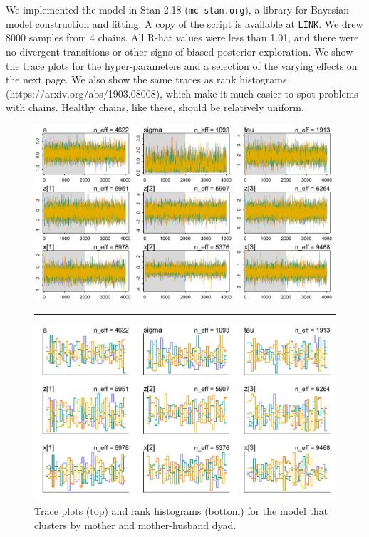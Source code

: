 \documentclass[reqno ,12pt]{amsart}
\begin{document}
We implemented the model in Stan 2.18 (\texttt{mc-stan.org}), a library for Bayesian model construction and fitting. A copy of the script is available at \texttt{LINK}. We drew 8000 samples from 4 chains. All R-hat values were less than 1.01, and there were no divergent transitions or other signs of biased posterior exploration. We show the trace plots for the hyper-parameters and a selection of the varying effects on the next page. We also show the same traces as rank histograms (https://arxiv.org/abs/1903.08008), which make it much easier to spot problems with chains. Healthy chains, like these, should be relatively uniform.

\begin{figure}[p]
\begin{center}
	\includegraphics[scale=0.7]{trace.pdf}
	\hrule
	\includegraphics[scale=0.7]{trank.pdf}
\caption{Trace plots (top) and rank histograms (bottom) for the model that clusters by mother and mother-husband dyad.}
\label{fig_traces}
\end{center}
\end{figure}
\end{document}
